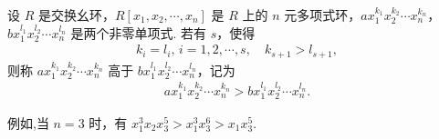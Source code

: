 \documentclass[../../main.tex]{subfiles}%
\begin{document}
\begin{definition}[单项式的字典排序法]
设 \( R \) 是交换幺环，\( R[x_1, x_2, \cdots, x_n] \) 是 \( R \) 上的 \( n \) 元多项式环，\( ax_1^{k_1}x_2^{k_2}\cdots x_n^{k_n} \)，\( bx_1^{l_1}x_2^{l_2}\cdots x_n^{l_n} \) 是两个非零单项式. 若有 \( s \)，使得
\begin{align*}
k_i = l_i, \, i = 1, 2, \cdots, s, \quad k_{s+1} > l_{s+1},
\end{align*}
则称 \( ax_1^{k_1}x_2^{k_2}\cdots x_n^{k_n} \) 高于 \( bx_1^{l_1}x_2^{l_2}\cdots x_n^{l_n} \)，记为
\begin{align*}
ax_1^{k_1}x_2^{k_2}\cdots x_n^{k_n} > bx_1^{l_1}x_2^{l_2}\cdots x_n^{l_n}.
\end{align*}
\end{definition}
\begin{note}
例如,当 \( n = 3 \) 时，有 \( x_1^3x_2x_3^5 > x_1^3x_3^6 > x_1x_3^5 \).
\end{note}
\end{document}

